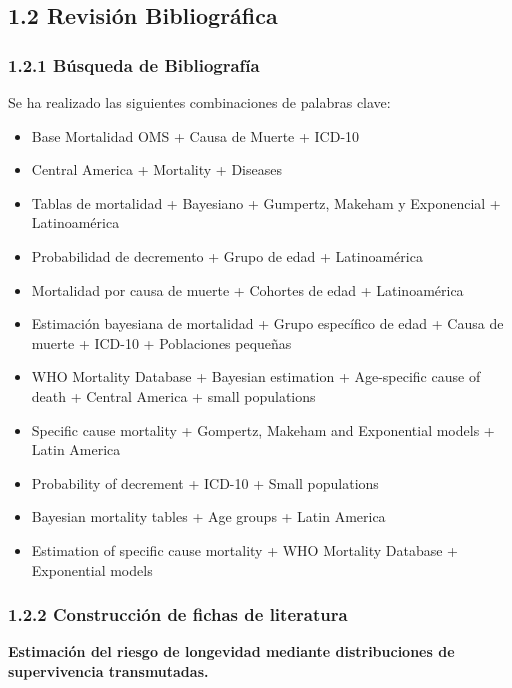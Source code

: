 \documentclass[
  letterpaper,
  DIV=11,
  numbers=noendperiod]{scrartcl}
\providecommand{\tightlist}{%
  \setlength{\itemsep}{0pt}\setlength{\parskip}{0pt}}\usepackage{longtable,booktabs,array}
\begin{document}
\subsection{1.2 Revisión
Bibliográfica}\label{revisiuxf3n-bibliogruxe1fica}

\subsubsection{1.2.1 Búsqueda de
Bibliografía}\label{buxfasqueda-de-bibliografuxeda}

Se ha realizado las siguientes combinaciones de palabras clave:

\begin{itemize}
\tightlist
\item
  Base Mortalidad OMS + Causa de Muerte + ICD-10
\item
  Central America + Mortality + Diseases
\item
  Tablas de mortalidad + Bayesiano + Gumpertz, Makeham y Exponencial +
  Latinoamérica
\item
  Probabilidad de decremento + Grupo de edad + Latinoamérica
\item
  Mortalidad por causa de muerte + Cohortes de edad + Latinoamérica
\item
  Estimación bayesiana de mortalidad + Grupo específico de edad + Causa
  de muerte + ICD-10 + Poblaciones pequeñas
\item
  WHO Mortality Database + Bayesian estimation + Age-specific cause of
  death + Central America + small populations
\item
  Specific cause mortality + Gompertz, Makeham and Exponential models +
  Latin America
\item
  Probability of decrement + ICD-10 + Small populations
\item
  Bayesian mortality tables + Age groups + Latin America
\item
  Estimation of specific cause mortality + WHO Mortality Database +
  Exponential models
\end{itemize}

\subsubsection{1.2.2 Construcción de fichas de
literatura}\label{construcciuxf3n-de-fichas-de-literatura}

\textbf{Estimación del riesgo de longevidad mediante distribuciones de
supervivencia transmutadas.}
\end{document}
